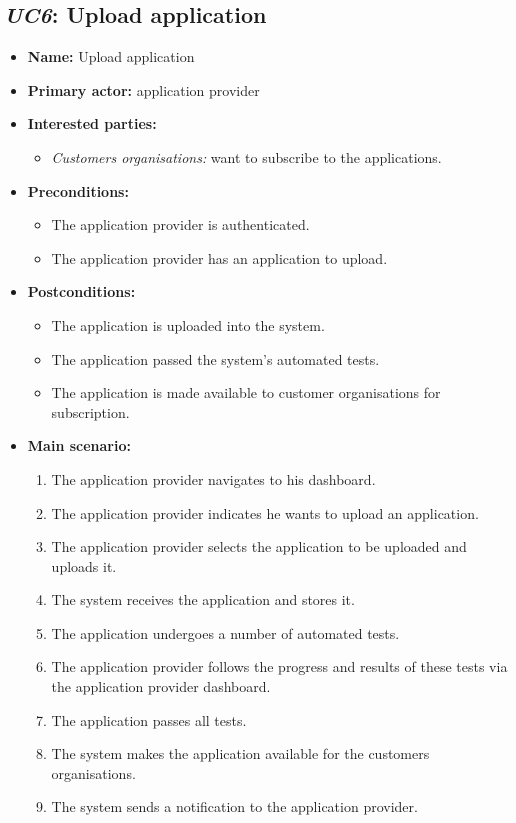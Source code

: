 \subsection{\emph{UC6}: Upload application}
\begin{itemize}
    \item \textbf{Name:} Upload application
    \item \textbf{Primary actor:} application provider
    \item \textbf{Interested parties:}
        \begin{itemize}
            \item \textit{Customers organisations:} want to subscribe to the applications.
        \end{itemize}

    \item \textbf{Preconditions:}
        \begin{itemize}
            \item The application provider is authenticated.
            \item The application provider has an application to upload.
        \end{itemize}

    \item \textbf{Postconditions:}
        \begin{itemize}
            \item The application is uploaded into the system.
            \item The application passed the system's automated tests.
            \item The application is made available to customer organisations for subscription.
        \end{itemize}

    \item \textbf{Main scenario:}
    \begin{enumerate}
       \item The application provider navigates to his dashboard.
       \item The application provider indicates he wants to upload an application.
       \item The application provider selects the application to be uploaded and
             uploads it.
       \item The system receives the application and stores it.
       \item The application undergoes a number of automated tests.
       \item The application provider follows the progress and results
             of these tests via the application provider dashboard.
       \item The application passes all tests.
       \item The system makes the application available for the customers organisations.
       \item The system sends a notification to the application provider.
    \end{enumerate}


\end{itemize}
